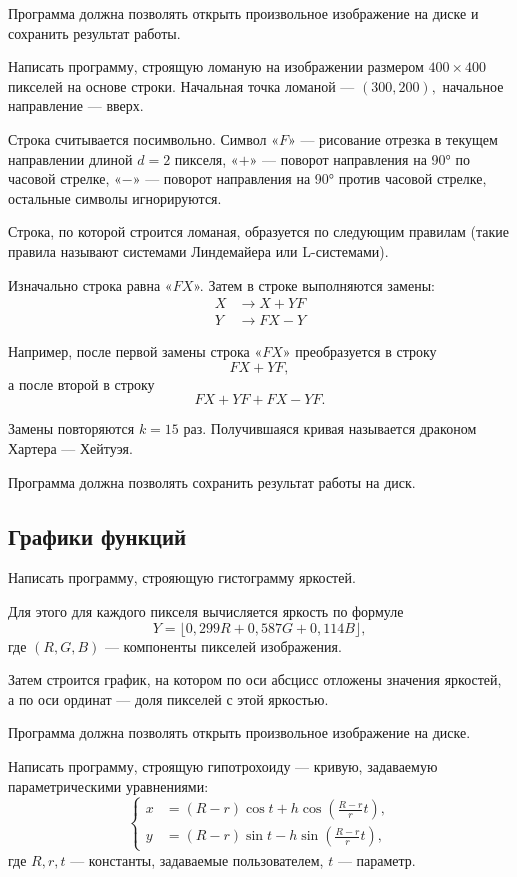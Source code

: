 Программа должна позволять открыть произвольное изображение на диске и
сохранить результат работы.

\task Написать программу, строящую ломаную на изображении размером
$400 \times 400$ пикселей на основе строки. Начальная точка ломаной —
$(300, 200),$ начальное направление — вверх.

Строка считывается посимвольно. Символ «$F$» — рисование отрезка в
текущем направлении длиной $d=2$ пикселя, «$+$» — поворот направления на
90° по часовой стрелке, «$-$» — поворот направления на 90° против
часовой стрелке, остальные символы игнорируются.

Строка, по которой строится ломаная, образуется по следующим правилам
(такие правила называют системами Линдемайера или L-системами).

Изначально строка равна «$FX$». Затем в строке выполняются замены:
\[
\begin{aligned}
  X &\to X+YF\\
  Y &\to FX-Y
\end{aligned}
\]

Например, после первой замены строка «$FX$» преобразуется в строку
\[
FX+YF,
\]
а после второй в строку
\[
FX+YF+FX-YF.
\]

Замены повторяются $k = 15$ раз. Получившаяся кривая называется
драконом Хартера — Хейтуэя.

Программа должна позволять сохранить результат работы на диск.


\subsection{Графики функций}

\task Написать программу, строяющую гистограмму яркостей.

Для этого для каждого пикселя вычисляется яркость по формуле
\[
Y = \lfloor 0{,}299 R + 0{,}587 G + 0{,}114 B \rfloor,
\]
где $(R,G,B)$ — компоненты пикселей изображения.

Затем строится график, на котором по оси абсцисс отложены значения
яркостей, а по оси ординат — доля пикселей с этой яркостью.

Программа должна позволять открыть произвольное изображение на диске.

\task Написать программу, строящую гипотрохоиду — кривую, задаваемую
параметрическими уравнениями:
\[
\left\{
  \begin{aligned}
    x &= \left( R - r \right) \cos t + h \cos \left( \frac{R-r}r t \right),\\
    y &= \left( R - r \right) \sin t - h \sin \left( \frac{R-r}r t \right),
  \end{aligned}
\right.
\]
где $R, r, t$ — константы, задаваемые пользователем, $t$ — параметр.

